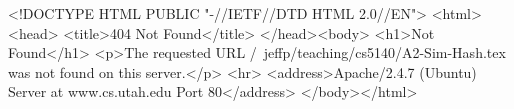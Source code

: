 <!DOCTYPE HTML PUBLIC "-//IETF//DTD HTML 2.0//EN">
<html><head>
<title>404 Not Found</title>
</head><body>
<h1>Not Found</h1>
<p>The requested URL /~jeffp/teaching/cs5140/A2-Sim-Hash.tex was not found on this server.</p>
<hr>
<address>Apache/2.4.7 (Ubuntu) Server at www.cs.utah.edu Port 80</address>
</body></html>
